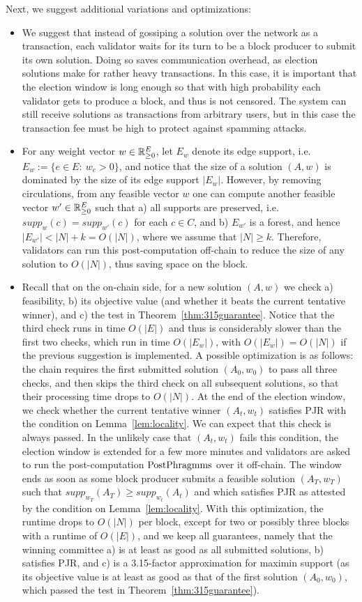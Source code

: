 Next, we suggest additional variations and optimizations:
\begin{itemize}
\item We suggest that instead of gossiping a solution over the network as a transaction, each validator waits for its turn to be a block producer to submit its own solution. Doing so saves communication overhead, as election solutions make for rather heavy transactions. In this case, it is important that the election window is long enough so that with high probability each validator gets to produce a block, and thus is not censored. 
The system can still receive solutions as transactions from arbitrary users, but in this case the transaction fee must be high to protect against spamming attacks. 
\item For any weight vector $w\in \mathbb{R}_{\geq 0}^E$, let $E_w$ denote its edge support, i.e. $E_w:=\{e\in E: \ w_e>0\}$, and notice that the size of a solution $(A,w)$ is dominated by the size of its edge support $|E_w|$. 
However, by removing circulations, from any feasible vector $w$ one can compute another feasible vector $w'\in\mathbb{R}_{\geq 0}^E$ such that a) all supports are preserved, i.e. $supp_w(c)=supp_{w'}(c)$ for each $c\in C$, and b) $E_{w'}$ is a forest, and hence $|E_{w'}|< |N|+k=O(|N|)$, where we assume that $|N|\geq k$. Therefore, validators can run this post-computation off-chain to reduce the size of any solution to $O(|N|)$, thus saving space on the block.

\item Recall that on the on-chain side, for a new solution $(A,w)$ we check a) feasibility, b) its objective value (and whether it beats the current tentative winner), and c) the test in Theorem~\ref{thm:315guarantee}. Notice that the third check runs in time $O(|E|)$ and thus is considerably slower than the first two checks, which run in time $O(|E_w|)$, with $O(|E_w|)=O(|N|)$ if the previous suggestion is implemented. 
A possible optimization is as follows: the chain requires the first submitted solution $(A_0, w_0)$ to pass all three checks, and then skips the third check on all subsequent solutions, so that their processing time drops to $O(|N|)$. At the end of the election window, we check whether the current tentative winner $(A_t, w_t)$ satisfies PJR with the condition on Lemma~\ref{lem:locality}. 
We can expect that this check is always passed. In the unlikely case that $(A_t, w_t)$ fails this condition, the election window is extended for a few more minutes and validators are asked to run the post-computation $\operatorname{PostPhragmms}$ over it off-chain. 
The window ends as soon as some block producer submits a feasible solution $(A_T, w_T)$ such that $supp_{w_T}(A_T)\geq supp_{w_t}(A_t)$ and which satisfies PJR as attested by the condition on Lemma~\ref{lem:locality}. 
With this optimization, the runtime drops to $O(|N|)$ per block, except for two or possibly three blocks with a runtime of $O(|E|)$, and we keep all guarantees, namely that the winning committee a) is at least as good as all submitted solutions, b) satisfies PJR, and c) is a 3.15-factor approximation for maximin support (as its objective value is at least as good as that of the first solution $(A_0, w_0)$, which passed the test in Theorem~\ref{thm:315guarantee}). 


\end{itemize}
